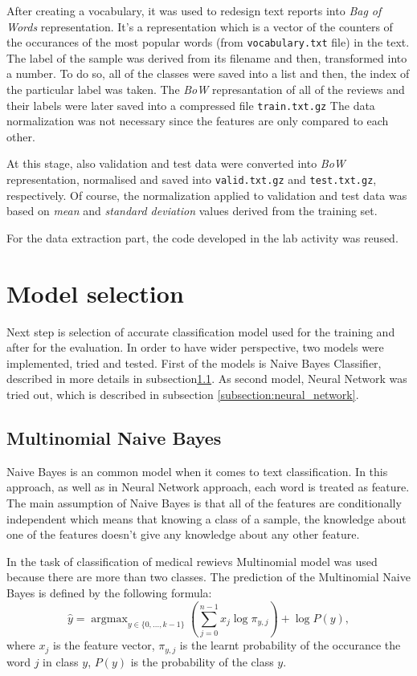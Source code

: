 \documentclass{article}
\DeclareMathOperator*{\argmax}{argmax}
\begin{document}
After creating a vocabulary, it was used to redesign text reports into \textit{Bag of Words} representation. It's a representation which is a vector of the counters of the occurances of the most popular words (from \texttt{vocabulary.txt} file) in the text. The label of the sample was derived from its filename and then, transformed into a number. To do so, all of the classes were saved into a list and then, the index of the particular label was taken. The \textit{BoW} represantation of all of the reviews and their labels were later saved into a compressed file \texttt{train.txt.gz} The data normalization was not necessary since the features are only compared to each other.

At this stage, also validation and test data were converted into \textit{BoW} representation, normalised and saved into \texttt{valid.txt.gz} and \texttt{test.txt.gz}, respectively. Of course, the normalization applied to validation and test data was based on \textit{mean} and \textit{standard deviation} values derived from the training set.

For the data extraction part, the code developed in the lab activity was reused.

\section{Model selection}
Next step is selection of accurate classification model used for the training and after for the evaluation. In order to have wider perspective, two models were implemented, tried and tested. First of the models is Naive Bayes Classifier, described in more details in subsection\ref{subsection:naive_bayes}. As second model, Neural Network was tried out, which is described in subsection \ref{subsection:neural_network}.

\subsection{Multinomial Naive Bayes}
\label{subsection:naive_bayes}
Naive Bayes is an common model when it comes to text classification. In this approach, as well as in Neural Network approach, each word is treated as feature. The main assumption of Naive Bayes is that all of the features are conditionally independent which means that knowing a class of a sample, the knowledge about one of the features doesn't give any knowledge about any other feature.

In the task of classification of medical rewievs Multinomial model was used because there are more than two classes. The prediction of the Multinomial Naive Bayes is defined by the following formula:
\begin{equation}
    \hat{y} = \argmax_{y \in \{0, ..., k-1\}} \left( \sum^{n - 1}_{j = 0} x_j \log \pi_{y, j} \right) + \log P(y),
\end{equation}
where $x_j$ is the feature vector, $\pi_{y, j}$ is the learnt probability of the occurance the word $j$ in class $y$, $P(y)$ is the probability of the class $y$.
\end{document}
